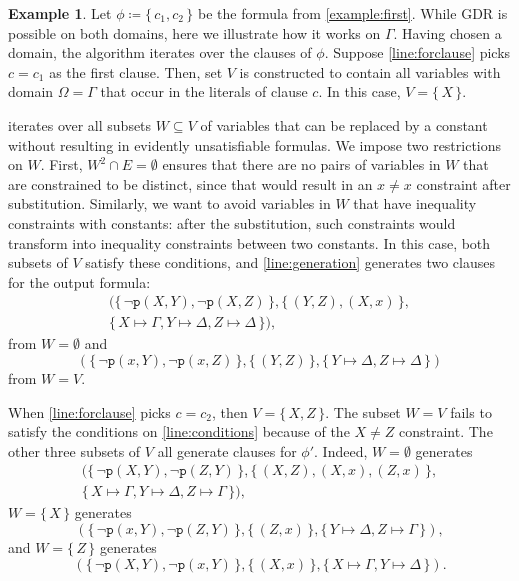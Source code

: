 \documentclass{article}
\theoremstyle{definition}
\newtheorem{example}{Example}
\theoremstyle{remark}
\begin{document}
\begin{example}
  Let $\phi \coloneqq \{\, c_1, c_2 \,\}$ be the formula from
  \cref{example:first}. While GDR is possible on both domains, here we
  illustrate how it works on $\Gamma$. Having chosen a domain, the algorithm
  iterates over the clauses of $\phi$. Suppose \cref{line:forclause} picks
  $c = c_1$ as the first clause. Then, set $V$ is constructed to contain all
  variables with domain $\Omega = \Gamma$ that occur in the literals of clause
  $c$. In this case, $V = \{\, X \,\}$.

   iterates over all subsets $W \subseteq V$ of variables
  that can be replaced by a constant without resulting in evidently
  unsatisfiable formulas. We impose two restrictions on $W$. First,
  $W^2 \cap E = \emptyset$ ensures that there are no pairs of variables in $W$
  that are constrained to be distinct, since that would result in an $x \ne x$
  constraint after substitution. Similarly, we want to avoid variables in $W$
  that have inequality constraints with constants: after the substitution, such
  constraints would transform into inequality constraints between two constants.
  In this case, both subsets of $V$ satisfy these conditions, and
  \cref{line:generation} generates two clauses for the output formula:
  \begin{multline*}
    (\{\, \neg \texttt{p}(X, Y), \neg \texttt{p}(X, Z) \,\}, \{\, (Y, Z), (X, x) \,\}, \\
    \{\, X \mapsto \Gamma, Y \mapsto \Delta, Z \mapsto \Delta \,\}),
  \end{multline*}
  from $W = \emptyset$ and
  \[
    (\{\, \neg \texttt{p}(x, Y), \neg \texttt{p}(x, Z) \,\}, \{\, (Y, Z) \,\}, \{\, Y \mapsto \Delta, Z \mapsto \Delta \,\})
  \]
  from $W = V$.

  When \cref{line:forclause} picks $c = c_2$, then $V = \{\, X, Z \,\}$. The
  subset $W = V$ fails to satisfy the conditions on \cref{line:conditions}
  because of the $X \ne Z$ constraint. The other three subsets of $V$ all
  generate clauses for $\phi'$. Indeed, $W = \emptyset$ generates
  \begin{multline*}
    (\{\, \neg \texttt{p}(X, Y), \neg \texttt{p}(Z, Y) \,\}, \{\, (X, Z), (X, x), (Z, x) \,\}, \\
    \{\, X \mapsto \Gamma, Y \mapsto \Delta, Z \mapsto \Gamma \,\}),
  \end{multline*}
  $W = \{\, X \,\}$ generates
  \[
    (\{\, \neg \texttt{p}(x, Y), \neg \texttt{p}(Z, Y) \,\}, \{\, (Z, x) \,\}, \{\, Y \mapsto \Delta, Z \mapsto \Gamma \,\}),
  \]
  and $W = \{\, Z \,\}$ generates
  \[
    (\{\, \neg \texttt{p}(X, Y), \neg \texttt{p}(x, Y) \,\}, \{\, (X, x) \,\}, \{\, X \mapsto \Gamma, Y \mapsto \Delta \,\}).
  \]
\end{example}
\end{document}
